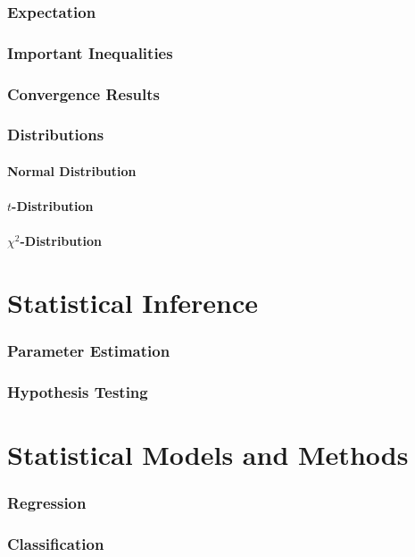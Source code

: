 \documentclass{article}
\begin{document}
\section{Expectation}
\section{Important Inequalities}
\section{Convergence Results}
\section{Distributions}
\subsection{Normal Distribution}
\subsection{$t$-Distribution}
\subsection{$\chi^2$-Distribution}

\newpage
\part{Statistical Inference}
\section{Parameter Estimation}
\section{Hypothesis Testing}

\newpage
\part{Statistical Models and Methods}
\section{Regression}
\section{Classification}

    
\end{document}

